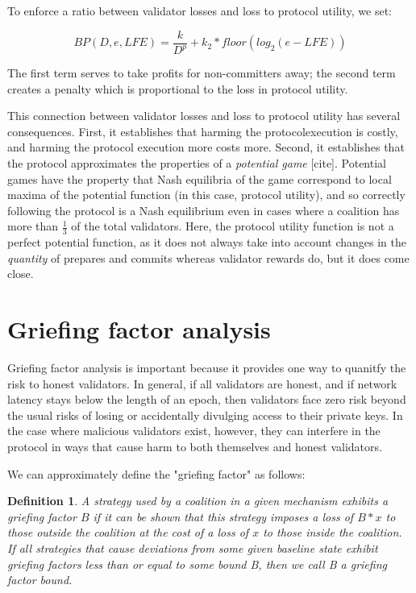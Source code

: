 \documentclass[12pt]{article}
\newtheorem{definition}{Definition}
\begin{document}
To enforce a ratio between validator losses and loss to protocol utility, we set:

$$BP(D, e, LFE) = \frac{k}{D^p} + k_2 * floor(log_2(e - LFE))$$

The first term serves to take profits for non-committers away; the second term creates a penalty which is proportional to the loss in protocol utility.

This connection between validator losses and loss to protocol utility has several consequences. First, it establishes that harming the protocolexecution is costly, and harming the protocol execution more costs more. Second, it establishes that the protocol approximates the properties of a \textit{potential game} [cite]. Potential games have the property that Nash equilibria of the game correspond to local maxima of the potential function (in this case, protocol utility), and so correctly following the protocol is a Nash equilibrium even in cases where a coalition has more than $\frac{1}{3}$ of the total validators. Here, the protocol utility function is not a perfect potential function, as it does not always take into account changes in the \textit{quantity} of prepares and commits whereas validator rewards do, but it does come close.

\section{Griefing factor analysis}

Griefing factor analysis is important because it provides one way to quanitfy the risk to honest validators. In general, if all validators are honest, and if network latency stays below the length of an epoch, then validators face zero risk beyond the usual risks of losing or accidentally divulging access to their private keys. In the case where malicious validators exist, however, they can interfere in the protocol in ways that cause harm to both themselves and honest validators.

We can approximately define the "griefing factor" as follows:

\begin{definition}
A strategy used by a coalition in a given mechanism exhibits a \textit{griefing factor} $B$ if it can be shown that this strategy imposes a loss of $B * x$ to those outside the coalition at the cost of a loss of $x$ to those inside the coalition. If all strategies that cause deviations from some given baseline state exhibit griefing factors less than or equal to some bound B, then we call B a \textit{griefing factor bound}.
\end{definition}
\end{document}
